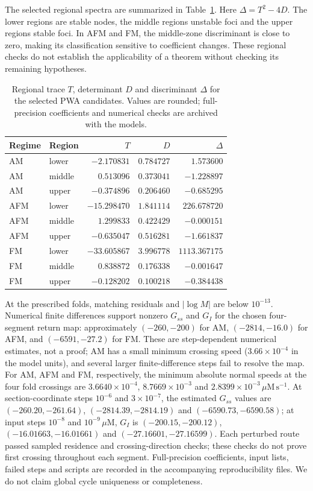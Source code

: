 The selected regional spectra are summarized in Table~\ref{tab:random-spectra}. Here $\Delta=T^2-4D$. The lower regions are stable nodes, the middle regions unstable foci and the upper regions stable foci. In AFM and FM, the middle-zone discriminant is close to zero, making its classification sensitive to coefficient changes. These regional checks do not establish the applicability of a theorem without checking its remaining hypotheses.
\begin{table}[t]
\centering
\caption{Regional trace $T$, determinant $D$ and discriminant $\Delta$ for the selected PWA candidates. Values are rounded; full-precision coefficients and numerical checks are archived with the models.}
\label{tab:random-spectra}
\begin{tabular}{llrrr}\toprule
Regime & Region & $T$ & $D$ & $\Delta$ \\\midrule
AM & lower & $-2.170831$ & $0.784727$ & $1.573600$ \\
AM & middle & $0.513096$ & $0.373041$ & $-1.228897$ \\
AM & upper & $-0.374896$ & $0.206460$ & $-0.685295$ \\
AFM & lower & $-15.298470$ & $1.841114$ & $226.678720$ \\
AFM & middle & $1.299833$ & $0.422429$ & $-0.000151$ \\
AFM & upper & $-0.635047$ & $0.516281$ & $-1.661837$ \\
FM & lower & $-33.605867$ & $3.996778$ & $1113.367175$ \\
FM & middle & $0.838872$ & $0.176338$ & $-0.001647$ \\
FM & upper & $-0.128202$ & $0.100218$ & $-0.384438$ \\\bottomrule
\end{tabular}
\end{table}

At the prescribed folds, matching residuals and $|\log M|$ are below $10^{-13}$. Numerical finite differences support nonzero $G_{ss}$ and $G_I$ for the chosen four-segment return map: approximately $(-260,-200)$ for AM, $(-2814,-16.0)$ for AFM, and $(-6591,-27.2)$ for FM. These are step-dependent numerical estimates, not a proof; AM has a small minimum crossing speed ($3.66\times10^{-4}$ in the model units), and several larger finite-difference steps fail to resolve the map. For AM, AFM and FM, respectively, the minimum absolute normal speeds at the four fold crossings are $3.6640\times10^{-4}$, $8.7669\times10^{-3}$ and $2.8399\times10^{-3}\,\mu\mathrm M\,\mathrm{s}^{-1}$. At section-coordinate steps $10^{-6}$ and $3\times10^{-7}$, the estimated $G_{ss}$ values are $(-260.20,-261.64)$, $(-2814.39,-2814.19)$ and $(-6590.73,-6590.58)$; at input steps $10^{-8}$ and $10^{-9}\,\mu\mathrm M$, $G_I$ is $(-200.15,-200.12)$, $(-16.01663,-16.01661)$ and $(-27.16601,-27.16599)$. Each perturbed route passed sampled residence and crossing-direction checks; these checks do not prove first crossing throughout each segment. Full-precision coefficients, input lists, failed steps and scripts are recorded in the accompanying reproducibility files. We do not claim global cycle uniqueness or completeness.

